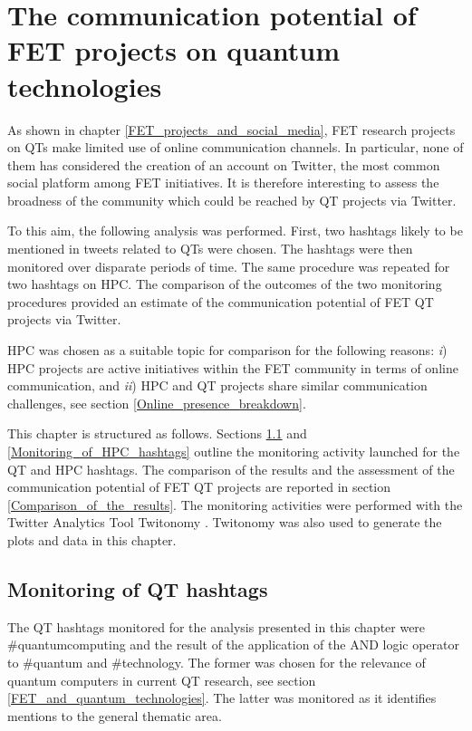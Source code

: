 \chapter{The communication potential of FET projects on quantum technologies}
As shown in chapter \ref{FET_projects_and_social_media}, FET research projects on QTs make limited use of online communication channels. In particular, none of them has considered the creation of an account on Twitter, the most common social platform among FET initiatives. It is therefore interesting to assess the broadness of the community which could be reached by QT projects via Twitter.

To this aim, the following analysis was performed. First, two hashtags likely to be mentioned in tweets related to QTs were chosen. The hashtags were then monitored over disparate periods of time. The same procedure was repeated for two hashtags on HPC. The comparison of the outcomes of the two monitoring procedures provided an estimate of the communication potential of FET QT projects via Twitter.

HPC was chosen as a suitable topic for comparison for the following reasons: \textit{i}) HPC projects are active initiatives within the FET community in terms of online communication, and \textit{ii}) HPC and QT projects share similar communication challenges, see section \ref{Online_presence_breakdown}.

This chapter is structured as follows. Sections \ref{Monitoring_of_QT_hashtags} and \ref{Monitoring_of_HPC_hashtags} outline the monitoring activity launched for the QT and HPC hashtags. The comparison of the results and the assessment of the communication potential of FET QT projects are reported in section \ref{Comparison_of_the_results}. The monitoring activities were performed with the Twitter Analytics Tool Twitonomy \cite{Twitonomy}. Twitonomy was also used to generate the plots and data in this chapter.

\section{Monitoring of QT hashtags} \label{Monitoring_of_QT_hashtags}
The QT hashtags monitored for the analysis presented in this chapter were \#quantumcomputing and the result of the application of the AND logic operator to \#quantum and \#technology. The former was chosen for the relevance of quantum computers in current QT research, see section \ref{FET_and_quantum_technologies}. The latter was monitored as it identifies mentions to the general thematic area. 

